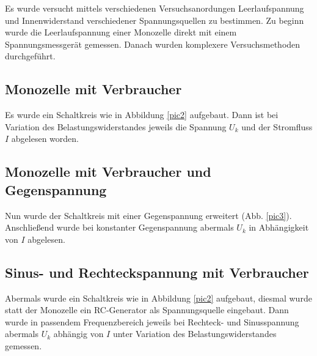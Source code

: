 %
Es wurde versucht mittels verschiedenen Versuchsanordungen Leerlaufspannung und Innenwiderstand
verschiedener Spannungsquellen zu bestimmen. Zu beginn wurde die Leerlaufspannung einer Monozelle
direkt mit einem Spannungsmessgerät gemessen. Danach wurden komplexere Versuchsmethoden durchgeführt.
\subsection{Monozelle mit Verbraucher}

Es wurde ein Schaltkreis wie in Abbildung \ref{pic2} aufgebaut. Dann ist bei Variation des 
Belastungswiderstandes jeweils die Spannung $U_k$ und der Stromfluss $I$ abgelesen worden.
\FloatBarrier
\subsection{Monozelle mit Verbraucher und Gegenspannung}

Nun wurde der Schaltkreis mit einer Gegenspannung erweitert (Abb. \ref{pic3}).
Anschließend wurde bei konstanter Gegenspannung abermals $U_k$ in Abhängigkeit von $I$ abgelesen.
\FloatBarrier
\subsection{Sinus- und Rechteckspannung mit Verbraucher}
Abermals wurde ein Schaltkreis wie in Abbildung \ref{pic2} aufgebaut, diesmal wurde statt der 
Monozelle ein RC-Generator als Spannungsquelle eingebaut. Dann wurde in passendem Frequenzbereich 
jeweils bei Rechteck- und Sinusspannung abermals $U_k$ abhängig von $I$ unter Variation des
Belastungswiderstandes gemessen.